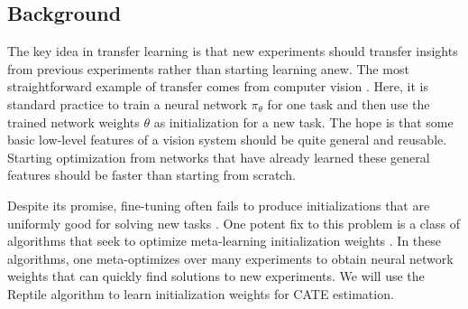 \subsection{Background}
The key idea in transfer learning is that new experiments should transfer insights from previous experiments rather than starting learning anew. The most straightforward example of transfer comes from computer vision \citep{finetune0, finetune2, finetune1, donahu}. %
Here, it is standard practice to train a neural network $\pi_\theta$ for one task and then use the trained network weights $\theta$ as initialization for a new task. The hope is that some basic low-level features of a vision system should be quite general and reusable. Starting optimization from networks that have already learned these general features should be faster than starting from scratch. 

Despite its promise, fine-tuning often fails to produce initializations that are uniformly good for solving new tasks \citep{maml}. One potent fix to this problem is a class of algorithms that seek to optimize meta-learning initialization weights \citep{maml, reptile}. In these algorithms, one meta-optimizes over many experiments to obtain neural network weights that can quickly find solutions to new experiments. We will use the Reptile algorithm to learn initialization weights for CATE estimation.   









